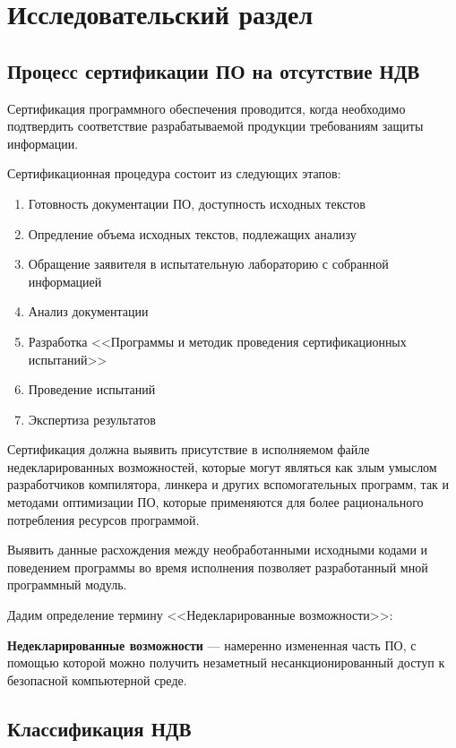 \chapter{Исследовательский раздел}\label{ch:ch1}
\section{Процесс сертификации ПО на отсутствие НДВ}\label{sec:ch1/sec1}
Сертификация программного обеспечения проводится, 
когда необходимо подтвердить соответствие разрабатываемой 
продукции требованиям защиты информации.

Сертификационная процедура состоит из следующих этапов:
\begin{enumerate}
    \item Готовность документации ПО, доступность исходных текстов
    \item Опредление объема исходных текстов, подлежащих анализу
    \item Обращение заявителя в испытательную лабораторию с собранной информацией
    \item Анализ документации
    \item Разработка <<Программы и методик проведения сертификационных испытаний>>
    \item Проведение испытаний
    \item Экспертиза результатов
\end{enumerate}

Сертификация должна выявить присутствие в исполняемом файле недекларированных возможностей,
которые могут являться как злым умыслом\autocite{compile-a-virus, ken-thompson-hack} 
разработчиков компилятора, линкера и других вспомогательных программ,
так и методами оптимизации ПО, которые применяются для более рационального 
потребления ресурсов программой.

Выявить данные расхождения между необработанными исходными кодами и 
поведением программы во время исполнения позволяет разработанный мной
программный модуль.

Дадим определение термину <<Недекларированные возможности>>:

\textbf{Недекларированные возможности}\autocite{undeclared-capabilities-antimalware} 
— намеренно измененная часть ПО, с помощью которой можно получить незаметный 
несанкционированный доступ к безопасной компьютерной среде.

\section{Классификация НДВ}\label{sec:ch1/sec2}
